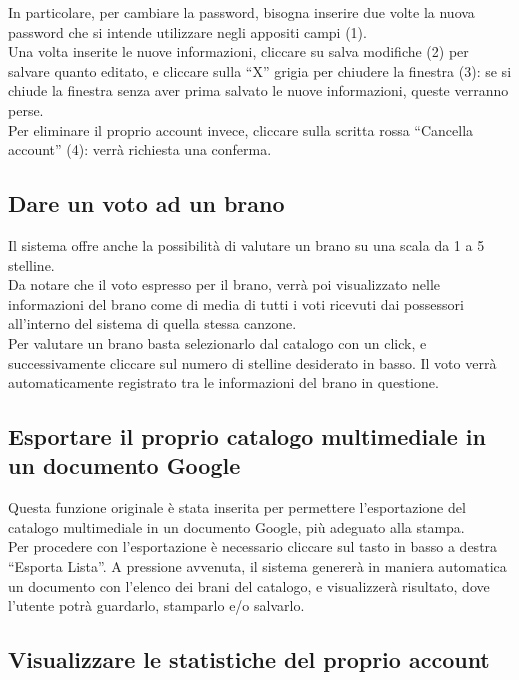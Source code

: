 In particolare, per cambiare la password, bisogna inserire due volte la nuova
password che si intende utilizzare negli appositi campi (1).\\

Una volta inserite le nuove informazioni, cliccare su salva modifiche (2) per
salvare quanto editato, e cliccare sulla ``X'' grigia per chiudere la finestra
(3): se si chiude la finestra senza aver prima salvato le nuove informazioni,
queste verranno perse.\\

Per eliminare il proprio account invece, cliccare sulla scritta rossa ``Cancella
account'' (4): verr\`a richiesta una conferma.

\subsection{Dare un voto ad un brano}
\label{cap:voto}
Il sistema  offre anche la possibilit\`a di valutare un brano su una
scala da 1 a 5 stelline.\\
Da notare che il voto espresso per il brano, verr\`a poi visualizzato nelle
informazioni del brano come di media di tutti i voti ricevuti dai
possessori all'interno del sistema  di quella stessa canzone.\\
Per valutare un brano basta selezionarlo dal catalogo con un click, e
successivamente cliccare sul numero di stelline desiderato in basso. Il voto
verr\`a automaticamente registrato tra le informazioni del brano in questione.

\subsection{Esportare il proprio catalogo multimediale in un documento Google}

Questa funzione originale \`e stata inserita per permettere l'esportazione del
catalogo multimediale in un documento Google, pi\`u adeguato alla stampa.\\
Per procedere con l'esportazione \`e necessario cliccare sul tasto in
basso a destra ``Esporta Lista''. A pressione avvenuta, il sistema generer\`a
in maniera automatica un documento con l'elenco dei brani del catalogo, e
visualizzer\`a risultato, dove l'utente potr\`a guardarlo, stamparlo e/o salvarlo.

\subsection{Visualizzare le statistiche del proprio account}

